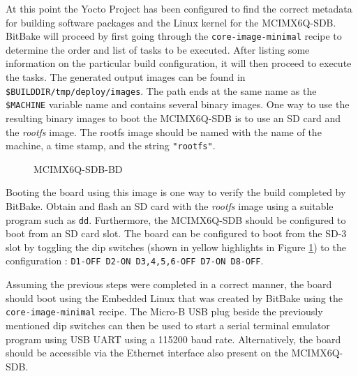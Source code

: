 At this point the Yocto Project has been configured to find the correct metadata for building software packages and the Linux kernel for the MCIMX6Q-SDB. BitBake will proceed by first going through the \texttt{core-image-minimal} recipe to determine the order and list of tasks to be executed. After listing some information on the particular build configuration, it will then proceed to execute the tasks. The generated output images can be found in \texttt{\$BUILDDIR/tmp/deploy/images}. The path ends at the same name as the \texttt{\$MACHINE} variable name and contains several binary images. One way to use the resulting binary images to boot the MCIMX6Q-SDB is to use an SD card and the \textit{rootfs} image. The rootfs image should be named with the name of the machine, a time stamp, and the string \texttt{"rootfs"}.

\begin{figure}[h]
	\centering
	\caption{MCIMX6Q-SDB-BD}
	\label{fig:mcimx6q-sdb}
\end{figure}

Booting the board using this image is one way to verify the build completed by BitBake. Obtain and flash an SD card with the \textit{rootfs} image using a suitable program such as \texttt{dd}. Furthermore, the MCIMX6Q-SDB should be configured to boot from an SD card slot. The board can be configured to boot from the SD-3 slot by toggling the dip switches (shown in yellow highlights in Figure \ref{fig:mcimx6q-sdb}) to the configuration : \texttt{D1-OFF D2-ON D3,4,5,6-OFF D7-ON D8-OFF}.

Assuming the previous steps were completed in a correct manner, the board should boot using the Embedded Linux that was created by BitBake using the \texttt{core-image-minimal} recipe. The Micro-B USB plug beside the previously mentioned dip switches can then be used to start a serial terminal emulator program using USB UART using a 115200 baud rate. Alternatively, the board should be accessible via the Ethernet interface also present on the MCIMX6Q-SDB.
